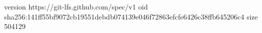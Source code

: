 version https://git-lfs.github.com/spec/v1
oid sha256:141ff55bf9072cb19551debdb074139e046f72863efcfe6426c38ffb645206c4
size 504129
